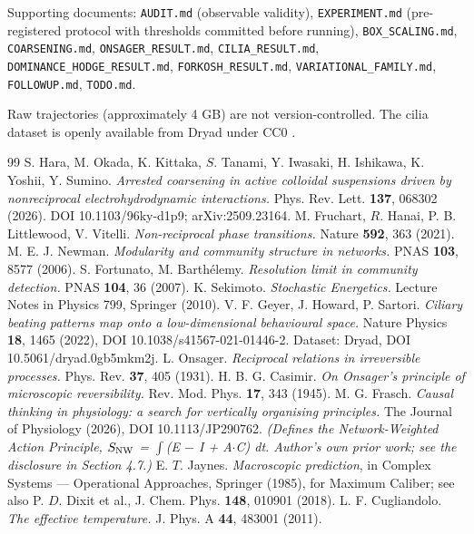 \documentclass[aps,pre,preprint,superscriptaddress,nofootinbib,longbibliography]{revtex4-2}
\begin{document}
Supporting documents: \texttt{AUDIT.md} (observable validity), \texttt{EXPERIMENT.md} (pre-registered protocol with thresholds committed before running), \texttt{BOX\_SCALING.md}, \texttt{COARSENING.md}, \texttt{ONSAGER\_RESULT.md}, \texttt{CILIA\_RESULT.md}, \texttt{DOMINANCE\_HODGE\_RESULT.md}, \texttt{FORKOSH\_RESULT.md}, \texttt{VARIATIONAL\_FAMILY.md}, \texttt{FOLLOWUP.md}, \texttt{TODO.md}.

Raw trajectories (approximately 4 GB) are not version-controlled. The cilia dataset is openly available from Dryad under CC0 \cite{r6}.

\begin{thebibliography}{99}
 S. Hara, M. Okada, K. Kittaka, $S$. Tanami, Y. Iwasaki, H. Ishikawa, K. Yoshii, Y. Sumino. \emph{Arrested coarsening in active colloidal suspensions driven by nonreciprocal electrohydrodynamic interactions.} Phys. Rev. Lett. \textbf{137}, 068302 (2026). DOI 10.1103/96ky-d1p9; arXiv:2509.23164.
 M. Fruchart, $R$. Hanai, P. B. Littlewood, V. Vitelli. \emph{Non-reciprocal phase transitions.} Nature \textbf{592}, 363 (2021).
 M. E. J. Newman. \emph{Modularity and community structure in networks.} PNAS \textbf{103}, 8577 (2006).
 S. Fortunato, M. Barth\'elemy. \emph{Resolution limit in community detection.} PNAS \textbf{104}, 36 (2007).
 K. Sekimoto. \emph{Stochastic Energetics.} Lecture Notes in Physics 799, Springer (2010).
 V. F. Geyer, J. Howard, P. Sartori. \emph{Ciliary beating patterns map onto a low-dimensional behavioural space.} Nature Physics \textbf{18}, 1465 (2022), DOI 10.1038/s41567-021-01446-2. Dataset: Dryad, DOI 10.5061/dryad.0gb5mkm2j.
 L. Onsager. \emph{Reciprocal relations in irreversible processes.} Phys. Rev. \textbf{37}, 405 (1931).
 H. B. G. Casimir. \emph{On Onsager's principle of microscopic reversibility.} Rev. Mod. Phys. \textbf{17}, 343 (1945).
 M. G. Frasch. \emph{Causal thinking in physiology: a search for vertically organising principles.} The Journal of Physiology (2026), DOI 10.1113/JP290762. \emph{(Defines the Network-Weighted Action Principle, $S_{\rm NW}$ = $\int$(E $-$ I + A$\cdot$C) dt. Author's own prior work; see the disclosure in Section 4.7.)}
 E. $T$. Jaynes. \emph{Macroscopic prediction}, in Complex Systems --- Operational Approaches, Springer (1985), for Maximum Caliber; see also P. $D$. Dixit et al., J. Chem. Phys. \textbf{148}, 010901 (2018).
 L. F. Cugliandolo. \emph{The effective temperature.} J. Phys. A \textbf{44}, 483001 (2011).

\end{thebibliography}
\end{document}
